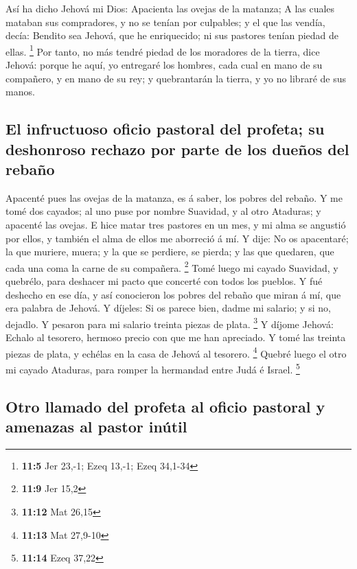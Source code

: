  Así ha dicho Jehová mi Dios: Apacienta las ovejas de la
matanza;  A las cuales mataban sus compradores, y no se
tenían por culpables; y el que las vendía, decía: Bendito sea Jehová,
que he enriquecido; ni sus pastores tenían piedad de ellas. \footnote{\textbf{11:5}
  Jer 23,-1; Ezeq 13,-1; Ezeq 34,1-34}  Por tanto, no más
tendré piedad de los moradores de la tierra, dice Jehová: porque he
aquí, yo entregaré los hombres, cada cual en mano de su compañero, y en
mano de su rey; y quebrantarán la tierra, y yo no libraré de sus manos.

\hypertarget{el-infructuoso-oficio-pastoral-del-profeta-su-deshonroso-rechazo-por-parte-de-los-dueuxf1os-del-rebauxf1o}{%
\subsection{El infructuoso oficio pastoral del profeta; su deshonroso
rechazo por parte de los dueños del
rebaño}\label{el-infructuoso-oficio-pastoral-del-profeta-su-deshonroso-rechazo-por-parte-de-los-dueuxf1os-del-rebauxf1o}}

 Apacenté pues las ovejas de la matanza, es á saber, los
pobres del rebaño. Y me tomé dos cayados; al uno puse por nombre
Suavidad, y al otro Ataduras; y apacenté las ovejas.  E
hice matar tres pastores en un mes, y mi alma se angustió por ellos, y
también el alma de ellos me aborreció á mí.  Y dije: No os
apacentaré; la que muriere, muera; y la que se perdiere, se pierda; y
las que quedaren, que cada una coma la carne de su compañera.
\footnote{\textbf{11:9} Jer 15,2}  Tomé luego mi cayado
Suavidad, y quebrélo, para deshacer mi pacto que concerté con todos los
pueblos.  Y fué deshecho en ese día, y así conocieron los
pobres del rebaño que miran á mí, que era palabra de Jehová.
 Y díjeles: Si os parece bien, dadme mi salario; y si no,
dejadlo. Y pesaron para mi salario treinta piezas de plata. \footnote{\textbf{11:12}
  Mat 26,15}  Y díjome Jehová: Echalo al tesorero,
hermoso precio con que me han apreciado. Y tomé las treinta piezas de
plata, y echélas en la casa de Jehová al tesorero. \footnote{\textbf{11:13}
  Mat 27,9-10}  Quebré luego el otro mi cayado Ataduras,
para romper la hermandad entre Judá é Israel. \footnote{\textbf{11:14}
  Ezeq 37,22}

\hypertarget{otro-llamado-del-profeta-al-oficio-pastoral-y-amenazas-al-pastor-inuxfatil}{%
\subsection{Otro llamado del profeta al oficio pastoral y amenazas al
pastor
inútil}\label{otro-llamado-del-profeta-al-oficio-pastoral-y-amenazas-al-pastor-inuxfatil}}

